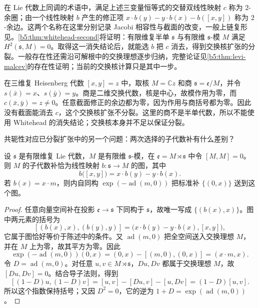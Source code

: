 在 Lie 代数上同调的术语中，满足上述三变量恒等式的交替双线性映射 \(c\) 称为 \(2\)-余圈；由一个线性映射 \(b\) 产生的修正项 \(x\cdot b(y)-y\cdot b(x)-b([x,y])\) 称为 \(2\)-余边。这两个名称在这里分别记录 Jacobi 相容性与截面的改变，一般上链复形见。\cref{b5:thm:whitehead-second}将证明：有限维复半单 \(\mathfrak s\) 与有限维 \(\mathfrak s\)-模 \(M\) 满足 \(H^2(\mathfrak s,M)=0\)。取得这一消失结论后，就能选 \(b\) 把 \(c\) 消去，得到交换核扩张的分裂。一般存在性还需沿可解根中的交换理想逐步归纳，完整论证见\cref{b5:thm:levi-malcev}的存在性证明；当前的交换核计算只是其中一步。

\begin{example}\label{b5:exm:heisenberg-extension-obstruction}
	在三维复 Heisenberg 代数 \([x,y]=z\) 中，取核 \(M=\mathbb Cz\) 和商 \(\mathfrak s=\mathfrak e/M\)，并令 \(s(\bar x)=x\)、\(s(\bar y)=y\)。商是二维交换代数，核是中心，故模作用为零，而 \(c(\bar x,\bar y)=z\ne0\)。任意截面修正的余边都为零，因为作用与商括号都为零。因此没有截面能消去 \(c\)，这个交换核扩张不分裂。这里的商不是半单代数，所以不能使用 Whitehead 的消失结论；交换核本身并不足以保证分裂。
\end{example}

共轭性对应已分裂扩张中的另一个问题：两次选择的子代数补有什么差别？

\begin{proposition}\label{b5:prop:abelian-splitting-complements}
	设 \(\mathfrak s\) 是有限维复 Lie 代数，\(M\) 是有限维 \(\mathfrak s\)-模，在 \(\mathfrak e=M\rtimes\mathfrak s\) 中令 \([M,M]=0\)。则 \(M\) 的子代数补恰为线性映射 \(b:\mathfrak s\rightarrow M\) 的图，其中
	\[
		b\bigl([x,y]\bigr)=x\cdot b(y)-y\cdot b(x).
	\]
	若 \(b(x)=x\cdot m\)，则内自同构 \(\exp(-\operatorname{ad}(m,0))\) 把标准补 \(\{(0,x)\}\) 送到这个图。
\end{proposition}
\begin{proof}
	任意向量空间补在投影 \(\mathfrak e\rightarrow\mathfrak s\) 下同构于 \(\mathfrak s\)，故唯一写成 \(\{(b(x),x)\}\)。图中两元素的括号为
	\[
		[(b(x),x),(b(y),y)] =\bigl(x\cdot b(y)-y\cdot b(x),[x,y]\bigr),
	\]
	它属于图恰好等价于陈述中的条件。又 \(\operatorname{ad}(m,0)\) 把全空间送入交换理想 \(M\)，并在 \(M\) 上为零，故其平方为零。因此
	\[
		\exp(-\operatorname{ad}(m,0))(0,x) =(0,x)-[(m,0),(0,x)]=(x\cdot m,x).
	\]
	令 \(D=\operatorname{ad}(m,0)\)。对任意 \(u,v\in M\rtimes\mathfrak s\)，\(Du,Dv\) 都属于交换理想 \(M\)，故 \([Du,Dv]=0\)。结合导子法则，得到
	\[
		[(1-D)u,(1-D)v] =[u,v]-[Du,v]-[u,Dv]=(1-D)[u,v].
	\]
	所以这个指数保持括号；又因 \(D^2=0\)，它的逆为 \(1+D=\exp(\operatorname{ad}(m,0))\)。
\end{proof}

